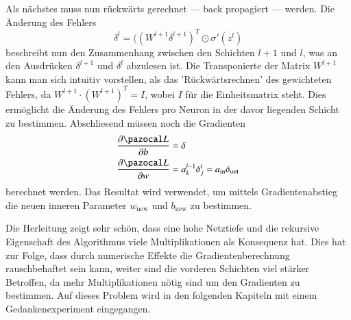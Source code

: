 Als nächstes muss nun rückwärts gerechnet --- back propagiert --- werden.
Die Änderung des Fehlers
\begin{equation}
\delta^{l} = ((W^{l+1} \delta^{l+1})^T \odot \sigma'(z^l)
\end{equation}
beschreibt nun den Zusammenhang zwischen den Schichten $l+1$ und $l$, was an den Ausdrücken $\delta^{l+1}$ und $ \delta^{l}$ abzulesen ist.
Die Transponierte der Matrix $W^{l+1}$ kann man sich intuitiv vorstellen, als das 'Rückwärtsrechnen' des gewichteten Fehlers, da $W^{l+1} \cdot (W^{l+1})^T = I$, wobei $I$ für die Einheitsmatrix steht.
Dies ermöglicht die Änderung des Fehlers pro Neuron in der davor liegenden Schicht zu bestimmen.
Abschliesend müssen noch die Gradienten
\begin{equation}
\begin{split}
\frac{\partial \Lb}{\partial b} & = \delta \\
\frac{\partial \Lb}{\partial w} & = a^{l-1}_{k} \delta^{l}_j = a_{\text{in}} \delta_{\text{out}}
\end{split}
\end{equation}
berechnet werden.
Das Resultat wird verwendet, um mittels Gradientenabstieg die neuen
inneren Parameter $w_\text{new}$ und $b_\text{new}$ zu bestimmen.

Die Herleitung zeigt sehr schön, dass eine hohe Netztiefe und die
rekursive Eigenschaft des Algorithmus viele Multiplikationen als
Konsequenz hat.
Dies hat zur Folge, dass durch numerische Effekte die Gradientenberechnung rauschbehaftet sein kann, weiter sind die vorderen Schichten viel stärker Betroffen, da mehr Multiplikationen nötig sind um den Gradienten zu bestimmen.
Auf dieses Problem wird in den folgenden Kapiteln mit einem Gedankenexperiment eingegangen.
%

